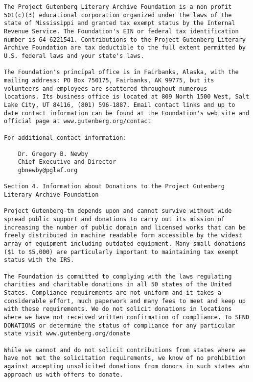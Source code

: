 \documentclass[oneside]{book}
\begin{document}
\begin{verbatim}
The Project Gutenberg Literary Archive Foundation is a non profit
501(c)(3) educational corporation organized under the laws of the
state of Mississippi and granted tax exempt status by the Internal
Revenue Service. The Foundation's EIN or federal tax identification
number is 64-6221541. Contributions to the Project Gutenberg Literary
Archive Foundation are tax deductible to the full extent permitted by
U.S. federal laws and your state's laws.

The Foundation's principal office is in Fairbanks, Alaska, with the
mailing address: PO Box 750175, Fairbanks, AK 99775, but its
volunteers and employees are scattered throughout numerous
locations. Its business office is located at 809 North 1500 West, Salt
Lake City, UT 84116, (801) 596-1887. Email contact links and up to
date contact information can be found at the Foundation's web site and
official page at www.gutenberg.org/contact

For additional contact information:

    Dr. Gregory B. Newby
    Chief Executive and Director
    gbnewby@pglaf.org

Section 4. Information about Donations to the Project Gutenberg
Literary Archive Foundation

Project Gutenberg-tm depends upon and cannot survive without wide
spread public support and donations to carry out its mission of
increasing the number of public domain and licensed works that can be
freely distributed in machine readable form accessible by the widest
array of equipment including outdated equipment. Many small donations
($1 to $5,000) are particularly important to maintaining tax exempt
status with the IRS.

The Foundation is committed to complying with the laws regulating
charities and charitable donations in all 50 states of the United
States. Compliance requirements are not uniform and it takes a
considerable effort, much paperwork and many fees to meet and keep up
with these requirements. We do not solicit donations in locations
where we have not received written confirmation of compliance. To SEND
DONATIONS or determine the status of compliance for any particular
state visit www.gutenberg.org/donate

While we cannot and do not solicit contributions from states where we
have not met the solicitation requirements, we know of no prohibition
against accepting unsolicited donations from donors in such states who
approach us with offers to donate.


\end{verbatim}
\end{document}
